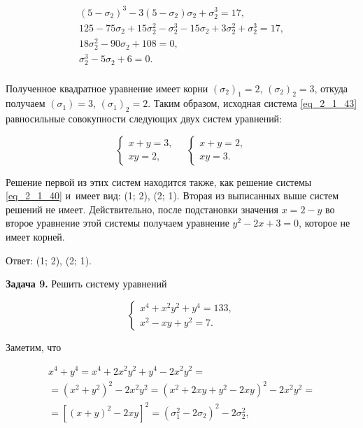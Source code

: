 \begin{gather*}
(5 - \sigma_{2})^{3} - 3(5 - \sigma_{2})\sigma_{2} + \sigma_{2}^{3} = 17, \\
125 - 75\sigma_{2} + 15\sigma_{2}^{2} - \sigma_{2}^{3}
- 15\sigma_{2} + 3\sigma_{2}^{2} + \sigma_{2}^3 = 17, \\
18\sigma_{2}^{2} - 90\sigma_{2} +108 = 0,\\
\sigma_{2}^{3} - 5\sigma_{2} + 6 = 0. \\
\end{gather*}

Полученное квадратное уравнение имеет корни $(\sigma_{2})_{1} = 2$,
$(\sigma_{2})_{2} = 3$, откуда получаем $(\sigma_{1}) = 3$, $(\sigma_{1})_{2} = 2$.
Таким образом, исходная система \eqref{eq_2_1_43} равносильные совокупности
следующих двух систем уравнений:

\begin{equation*}
\begin{cases}
x + y = 3, \\
xy = 2,
\end{cases}
\quad
\begin{cases}
x + y = 2, \\
xy = 3.
\end{cases}
\end{equation*}

Решение первой из этих систем находится также, как решение системы \eqref{eq_2_1_40}
и~имеет вид: (1; 2), (2; 1). Вторая из выписанных выше систем решений не имеет.
Действительно, после подстановки значения $x = 2 - y$ во второе уравнение
этой системы получаем уравнение $y^{2} - 2x + 3 = 0$, которое не имеет корней.

Ответ: (1; 2), (2; 1).

\textbf{Задача 9.} Решить систему уравнений

\begin{equation}\label{eq_2_1_45}
\begin{cases}
x^{4} + x^{2}y^{2} + y^{4} = 133, \\
x^{2} - xy + y^{2} = 7.
\end{cases}
\end{equation}

Заметим, что

\begin{multline}\label{eq_2_1_46}
x^{4} + y^{4} = 
x^{4} + 2x^{2}y^{2} + y^{4} - 2x^{2}y^{2} = \\
= (x^{2} + y^{2})^{2} - 2x^{2}y^{2} = 
(x^{2} + 2xy + y^{2} - 2xy)^{2} - 2x^{2}y^{2} = \\
= \left[
(x + y)^{2} - 2xy
\right]^{2} =
(\sigma_{1}^{2} - 2\sigma_{2})^{2} - 2\sigma_{2}^{2},
\end{multline}

